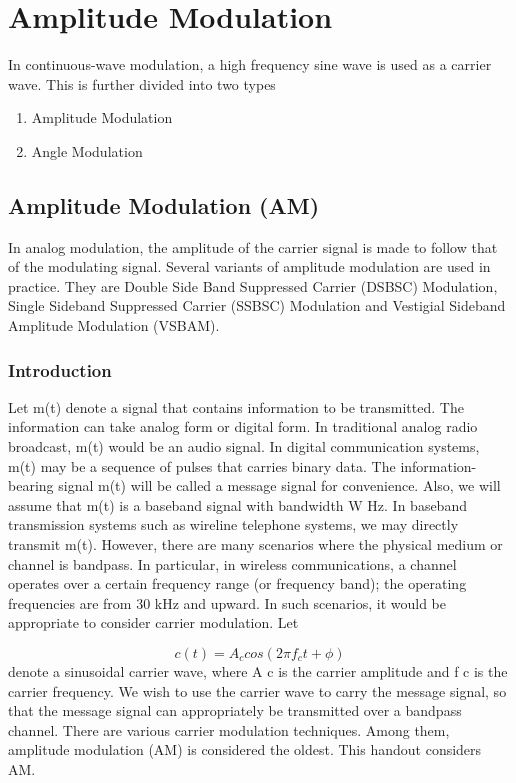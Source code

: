 \chapter{Amplitude Modulation}
In continuous-wave modulation, a high frequency sine wave is used as a carrier wave. This is further divided into two types

\begin{enumerate}
  \item Amplitude Modulation
  \item Angle Modulation
\end{enumerate}

\section{Amplitude Modulation (AM)}
In analog modulation, the amplitude of the carrier signal is made to follow that of the modulating signal. Several variants of amplitude modulation are used in practice. They are Double Side Band Suppressed Carrier (DSBSC) Modulation, Single Sideband Suppressed Carrier (SSBSC) Modulation and Vestigial Sideband Amplitude Modulation (VSBAM).

\subsection{Introduction}
Let m(t) denote a signal that contains information to be transmitted. The information can
take analog form or digital form. In traditional analog radio broadcast, m(t) would be an audio
signal. In digital communication systems, m(t) may be a sequence of pulses that carries binary
data. The information-bearing signal m(t) will be called a message signal for convenience. Also,
we will assume that m(t) is a baseband signal with bandwidth W Hz.
In baseband transmission systems such as wireline telephone systems, we may directly transmit
m(t). However, there are many scenarios where the physical medium or channel is bandpass.
In particular, in wireless communications, a channel operates over a certain frequency range (or
frequency band); the operating frequencies are from 30 kHz and upward. In such scenarios, it would
be appropriate to consider carrier modulation. Let

\begin{equation*}
  c(t) = A_c cos(2\pi f_c t + \phi)
\end{equation*}
denote a sinusoidal carrier wave, where A c is the carrier amplitude and f c is the carrier frequency.
We wish to use the carrier wave to carry the message signal, so that the message signal can
appropriately be transmitted over a bandpass channel.
There are various carrier modulation techniques. Among them, amplitude modulation (AM) is
considered the oldest. This handout considers AM.

